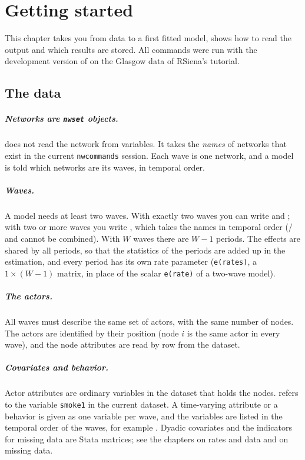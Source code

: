 \chapter{Getting started}\label{ch:start}

This chapter takes you from data to a first fitted model, shows how to read the output and which results are stored. All commands were run with the development version of \nwsaom{} on the Glasgow data of RSiena's tutorial.

\section{The data}

\paragraph{Networks are \texttt{nwset} objects.} \nwsaom{} does not read the network from variables. It takes the \emph{names} of networks that exist in the current \texttt{nwcommands} session. Each wave is one network, and a model is told which networks are its waves, in temporal order.

\paragraph{Waves.} A model needs at least two waves. With exactly two waves you can write  and ; with two or more waves you write , which takes the names in temporal order (/ and  cannot be combined). With $W$ waves there are $W-1$ periods. The effects are shared by all periods, so that the statistics of the periods are added up in the estimation, and every period has its own rate parameter (\texttt{e(rates)}, a $1\times(W-1)$ matrix, in place of the scalar \texttt{e(rate)} of a two-wave model).

\paragraph{The actors.} All waves must describe the same set of actors, with the same number of nodes. The actors are identified by their position (node $i$ is the same actor in every wave), and the node attributes are read by row from the dataset.

\paragraph{Covariates and behavior.} Actor attributes are ordinary variables in the dataset that holds the nodes.  refers to the variable \texttt{smoke1} in the current dataset. A time-varying attribute or a behavior is given as one variable per wave, and the variables are listed in the temporal order of the waves, for example . Dyadic covariates and the indicators for missing data are Stata matrices; see the chapters on rates and data and on missing data.

